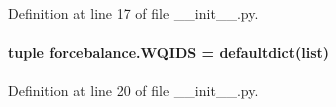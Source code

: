 Definition at line 17 of file \-\_\-\-\_\-init\-\_\-\-\_\-.\-py.

\hypertarget{namespaceforcebalance_a582a602e14175af1441d1ec96fe9a75a}{
\paragraph[{W\-Q\-I\-D\-S}]{\setlength{\rightskip}{0pt plus 5cm}tuple forcebalance.\-W\-Q\-I\-D\-S = defaultdict(list)}}\label{namespaceforcebalance_a582a602e14175af1441d1ec96fe9a75a}


Definition at line 20 of file \-\_\-\-\_\-init\-\_\-\-\_\-.\-py.

